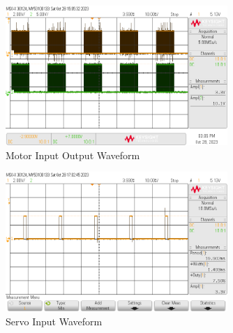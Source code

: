 \documentclass[CMPE]{KGCOEReport}
\begin{document}
\begin{figure}[H]
    \centering
    \includegraphics[width=0.75\textwidth]{MotorIO.png}
    \caption{Motor Input Output Waveform}
    \label{fig:motor}
\end{figure}

\begin{figure}[H]
    \centering
    \includegraphics[width=0.75\textwidth]{ServoWave.png}
    \caption{Servo Input Waveform}
    \label{fig:ServoWave}
\end{figure}
\end{document}
